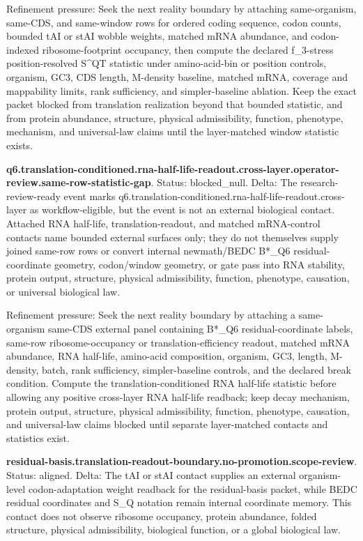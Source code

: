 Refinement pressure: Seek the next reality boundary by attaching same-organism, same-CDS, and same-window rows for ordered coding sequence, codon counts, bounded tAI or stAI wobble weights, matched mRNA abundance, and codon-indexed ribosome-footprint occupancy, then compute the declared f\_3-stress position-resolved S\textasciicircum{}QT statistic under amino-acid-bin or position controls, organism, GC3, CDS length, M-density baseline, matched mRNA, coverage and mappability limits, rank sufficiency, and simpler-baseline ablation. Keep the exact packet blocked from translation realization beyond that bounded statistic, and from protein abundance, structure, physical admissibility, function, phenotype, mechanism, and universal-law claims until the layer-matched window statistic exists.

\textbf{q6.translation-conditioned.rna-half-life-readout.cross-layer.operator-review.same-row-statistic-gap}. Status: blocked\_null. Delta: The research-review-ready event marks q6.translation-conditioned.rna-half-life-readout.cross-layer as workflow-eligible, but the event is not an external biological contact. Attached RNA half-life, translation-readout, and matched mRNA-control contacts name bounded external surfaces only; they do not themselves supply joined same-row rows or convert internal newmath/BEDC B*\_Q6 residual-coordinate geometry, codon/window geometry, or gate pass into RNA stability, protein output, structure, physical admissibility, function, phenotype, causation, or universal biological law.

Refinement pressure: Seek the next reality boundary by attaching a same-organism same-CDS external panel containing B*\_Q6 residual-coordinate labels, same-row ribosome-occupancy or translation-efficiency readout, matched mRNA abundance, RNA half-life, amino-acid composition, organism, GC3, length, M-density, batch, rank sufficiency, simpler-baseline controls, and the declared break condition. Compute the translation-conditioned RNA half-life statistic before allowing any positive cross-layer RNA half-life readback; keep decay mechanism, protein output, structure, physical admissibility, function, phenotype, causation, and universal-law claims blocked until separate layer-matched contacts and statistics exist.

\textbf{residual-basis.translation-readout-boundary.no-promotion.scope-review}. Status: aligned. Delta: The tAI or stAI contact supplies an external organism-level codon-adaptation weight readback for the residual-basis packet, while BEDC residual coordinates and S\_Q notation remain internal coordinate memory. This contact does not observe ribosome occupancy, protein abundance, folded structure, physical admissibility, biological function, or a global biological law.

